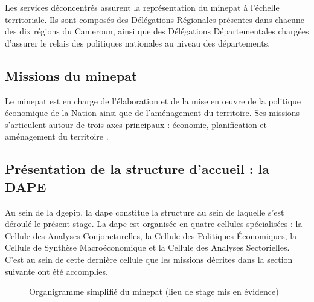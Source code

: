 \documentclass[12pt, a4paper, oneside]{report}
\begin{document}
Les services déconcentrés assurent la représentation du \gls{minepat} à l'échelle territoriale. Ils sont composés des Délégations Régionales présentes dans chacune des dix régions du Cameroun, ainsi que des Délégations Départementales chargées d'assurer le relais des politiques nationales au niveau des départements.

\subsection[Missions du MINEPAT]{Missions du \gls{minepat}}

Le \gls{minepat} est en charge de l'élaboration et de la mise en œuvre de la politique économique de la Nation ainsi que de l'aménagement du territoire. Ses missions s'articulent autour de trois axes principaux : économie, planification et aménagement du territoire \cite{minepat2009}.

\subsection{Présentation de la structure d'accueil : la DAPE}

Au sein de la \gls{dgepip}, la \gls{dape} constitue la structure au sein de laquelle s'est déroulé le présent stage. La \gls{dape} est organisée en quatre cellules spécialisées : la Cellule des Analyses Conjoncturelles, la Cellule des Politiques Économiques, la Cellule de Synthèse Macroéconomique et la Cellule des Analyses Sectorielles. C'est au sein de cette dernière cellule que les missions décrites dans la section suivante ont été accomplies.

\begin{figure}[H]
  \centering
  \caption{Organigramme simplifié du \gls{minepat} (lieu de stage mis en évidence)}
  \label{fig:organigramme}
\end{figure}
\end{document}
